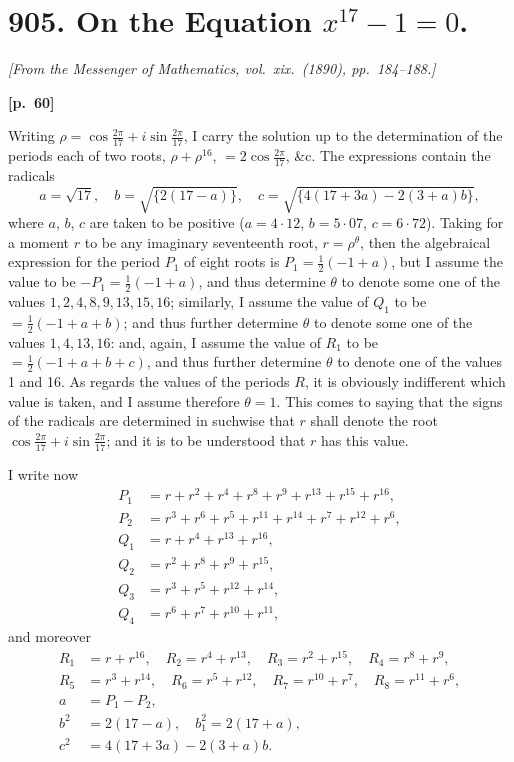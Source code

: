 \documentclass[11pt,a4paper]{article}
\theoremstyle{plain}
\begin{document}
\section*{905. On the Equation $x^{17} - 1 = 0$.}

\noindent\textit{[From the Messenger of Mathematics, vol.\ xix.\ (1890), pp.\ 184--188.]}

\vspace{0.5em}
\noindent\textbf{[p.\ 60]}

Writing $\rho = \cos\frac{2\pi}{17} + i\sin\frac{2\pi}{17}$, I carry the solution up to the determination of the periods each of two roots, $\rho + \rho^{16}$, $= 2\cos\frac{2\pi}{17}$, \&c. The expressions contain the radicals
$$
a = \sqrt{17}, \quad b = \sqrt{\{2(17 - a)\}}, \quad c = \sqrt{\{4(17 + 3a) - 2(3 + a)b\}},
$$
where $a$, $b$, $c$ are taken to be positive ($a = 4\cdot 12$, $b = 5\cdot 07$, $c = 6\cdot 72$). Taking for a moment $r$ to be any imaginary seventeenth root, $r = \rho^\theta$, then the algebraical expression for the period $P_1$ of eight roots is $P_1 = \frac{1}{2}(-1 + a)$, but I assume the value to be $-P_1 = \frac{1}{2}(-1 + a)$, and thus determine $\theta$ to denote some one of the values $1, 2, 4, 8, 9, 13, 15, 16$; similarly, I assume the value of $Q_1$ to be $= \frac{1}{2}(-1 + a + b)$; and thus further determine $\theta$ to denote some one of the values $1, 4, 13, 16$: and, again, I assume the value of $R_1$ to be $= \frac{1}{2}(-1 + a + b + c)$, and thus further determine $\theta$ to denote one of the values 1 and 16. As regards the values of the periods $R$, it is obviously indifferent which value is taken, and I assume therefore $\theta = 1$. This comes to saying that the signs of the radicals are determined in suchwise that $r$ shall denote the root $\cos\frac{2\pi}{17} + i\sin\frac{2\pi}{17}$; and it is to be understood that $r$ has this value.

I write now
\begin{align*}
P_1 &= r + r^2 + r^4 + r^8 + r^9 + r^{13} + r^{15} + r^{16}, \\
P_2 &= r^3 + r^6 + r^5 + r^{11} + r^{14} + r^7 + r^{12} + r^6, \\
Q_1 &= r + r^4 + r^{13} + r^{16}, \\
Q_2 &= r^2 + r^8 + r^9 + r^{15}, \\
Q_3 &= r^3 + r^5 + r^{12} + r^{14}, \\
Q_4 &= r^6 + r^7 + r^{10} + r^{11},
\end{align*}
and moreover
\begin{align*}
R_1 &= r + r^{16}, \quad R_2 = r^4 + r^{13}, \quad R_3 = r^2 + r^{15}, \quad R_4 = r^8 + r^9, \\
R_5 &= r^3 + r^{14}, \quad R_6 = r^5 + r^{12}, \quad R_7 = r^{10} + r^7, \quad R_8 = r^{11} + r^6, \\
a &= P_1 - P_2, \\
b^2 &= 2(17 - a), \quad b_1^2 = 2(17 + a), \\
c^2 &= 4(17 + 3a) - 2(3 + a)b.
\end{align*}
\end{document}
